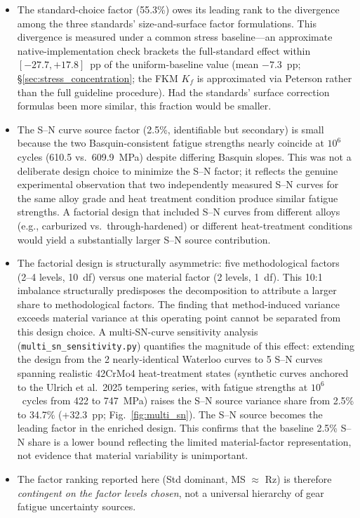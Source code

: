 \documentclass[twocolumn,12pt,a4paper]{article}
\begin{document}
\begin{itemize}
  \item The standard-choice factor (55.3\%) owes its leading rank to the
        divergence among the three standards' size-and-surface factor
        formulations. This divergence is measured under a common stress
        baseline---an approximate native-implementation check brackets
        the full-standard effect within $[-27.7, +17.8]$~pp of the
        uniform-baseline value (mean $-7.3$~pp;
        \S\ref{sec:stress_concentration}; the FKM $K_f$ is
        approximated via Peterson rather than the full guideline
        procedure). Had the standards' surface
        correction formulas been more similar, this fraction would be
        smaller.

  \item The S--N curve source factor (2.5\%, identifiable but
        secondary) is small because the two Basquin-consistent
        fatigue strengths nearly coincide at $10^6$ cycles (610.5 vs.\
        609.9~MPa) despite differing Basquin slopes.
        This was not a deliberate design choice to minimize the S--N
        factor; it reflects the genuine experimental observation that two
        independently measured S--N curves for the same alloy grade and
        heat treatment condition produce similar fatigue strengths.
        A factorial design that included S--N curves from
        different alloys (e.g., carburized vs.\ through-hardened) or
        different heat-treatment conditions would yield a substantially
        larger S--N source contribution.

  \item The factorial design is structurally asymmetric: five
        methodological factors (2--4 levels, 10~df) versus one
        material factor (2 levels, 1~df). This 10:1 imbalance
        structurally predisposes the decomposition to attribute a
        larger share to methodological factors. The finding that
        method-induced variance exceeds material variance at this
        operating point cannot be separated from this design choice.
        A multi-SN-curve sensitivity analysis
        (\texttt{multi\_sn\_sensitivity.py}) quantifies the magnitude
        of this effect: extending the design from the 2 nearly-identical
        Waterloo curves to 5 S--N curves spanning realistic 42CrMo4
        heat-treatment states (synthetic curves anchored to the
        Ulrich et al.\ 2025 tempering series, with fatigue strengths
        at $10^6$~cycles from 422 to 747~MPa) raises the S--N source
        variance share from 2.5\% to 34.7\% (+32.3~pp;
        Fig.~\ref{fig:multi_sn}). The S--N source becomes the leading
        factor in the enriched design. This confirms that the baseline
        2.5\% S--N share is a lower bound reflecting the limited
        material-factor representation, not evidence that material
        variability is unimportant.

  \item The factor ranking reported here (Std dominant,
        MS $\approx$ Rz) is therefore \emph{contingent on the factor
        levels chosen}, not a universal hierarchy of gear fatigue
        uncertainty sources.
\end{itemize}
\end{document}
